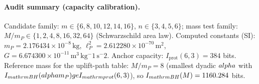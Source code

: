 \paragraph{Audit summary (capacity calibration).} \AuditTag Candidate family: $m\in\{6, 8, 10, 12, 14, 16\}$, $n\in\{3, 4, 5, 6\}$; mass test family: $M/m_P\in\{1, 2, 4, 8, 16, 32, 64\}$ (Schwarzschild area law).
\noindent\AuditTag Computed constants (SI): $m_P=2.176434\times 10^{-8}\,\mathrm{kg}$, $\ell_P^2=2.612280\times 10^{-70}\,\mathrm{m}^2$, $G=6.674300\times 10^{-11}\,\mathrm{m^3\,kg^-1\,s^-2}$.
\noindent\AuditTag Anchor capacity: $I_{\mathrm{prot}}(6,3)=384$ bits. Reference mass for the uplift-path table: $M/m_P=8$ (smallest dyadic $\\alpha$ with $I_{\\mathrm{BH}}(\\alpha m_P)\\ge I_{\\mathrm{prot}}(6,3)$), so $I_{\\mathrm{BH}}(M)=1160.284$ bits.